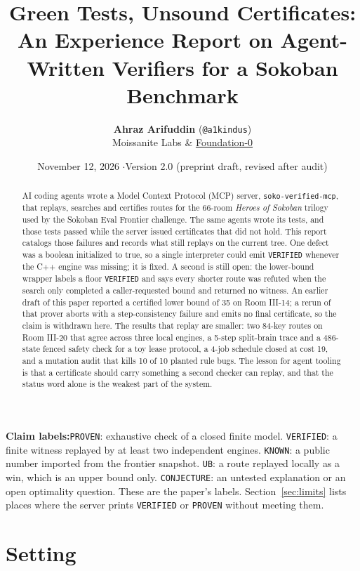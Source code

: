 \documentclass[11pt,a4paper]{article}
\title{\vspace{-8mm}\textbf{\Large Green Tests, Unsound Certificates:\\[3pt]
\large An Experience Report on Agent-Written Verifiers for a Sokoban Benchmark}}
\author{
  \textbf{Ahraz Arifuddin} (\texttt{@a1kindus})\\
  Moissanite Labs \& \href{https://github.com/Foundation-0}{Foundation-0}
}
\date{November 12, 2026 \quad$\cdot$\quad Version 2.0 (preprint draft, revised after audit)}
\newcommand{\takeaway}[2]{%
  \vspace{4pt}\noindent\colorbox{slatebg}{%
    \parbox{\dimexpr\linewidth-2\fboxsep\relax}{%
      \vspace{3pt}\textbf{\color{primary}#1:}\hspace{0.5em}#2\vspace{3pt}%
    }%
  }\vspace{4pt}%
}
\begin{document}
\maketitle

\begin{abstract}
\noindent AI coding agents wrote a Model Context Protocol (MCP) server, \texttt{soko-verified-mcp}, that replays, searches and certifies routes for the 66-room \emph{Heroes of Sokoban} trilogy used by the Sokoban Eval Frontier challenge. The same agents wrote its tests, and those tests passed while the server issued certificates that did not hold. This report catalogs those failures and records what still replays on the current tree. One defect was a boolean initialized to true, so a single interpreter could emit \texttt{VERIFIED} whenever the C++ engine was missing; it is fixed. A second is still open: the lower-bound wrapper labels a floor \texttt{VERIFIED} and says every shorter route was refuted when the search only completed a caller-requested bound and returned no witness. An earlier draft of this paper reported a certified lower bound of 35 on Room III-14; a rerun of that prover aborts with a step-consistency failure and emits no final certificate, so the claim is withdrawn here. The results that replay are smaller: two 84-key routes on Room III-20 that agree across three local engines, a 5-step split-brain trace and a 486-state fenced safety check for a toy lease protocol, a 4-job schedule closed at cost 19, and a mutation audit that kills 10 of 10 planted rule bugs. The lesson for agent tooling is that a certificate should carry something a second checker can replay, and that the status word alone is the weakest part of the system.
\end{abstract}

\takeaway{Claim labels}{\texttt{PROVEN}: exhaustive check of a closed finite model. \texttt{VERIFIED}: a finite witness replayed by at least two independent engines. \texttt{KNOWN}: a public number imported from the frontier snapshot. \texttt{UB}: a route replayed locally as a win, which is an upper bound only. \texttt{CONJECTURE}: an untested explanation or an open optimality question. These are the paper's labels. Section~\ref{sec:limits} lists places where the server prints \texttt{VERIFIED} or \texttt{PROVEN} without meeting them.}

\section{Setting}
\end{document}
